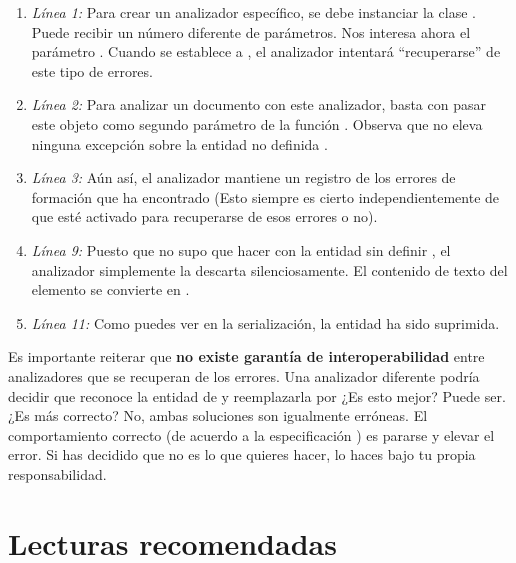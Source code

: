 \begin{enumerate}

  \item \emph{Línea 1:} Para crear un analizador específico, se debe instanciar la clase . Puede recibir un número diferente de parámetros. Nos interesa ahora el parámetro . Cuando se establece a , el analizador  intentará ``recuperarse'' de este tipo de errores.

\item \emph{Línea 2:} Para analizar un documento  con este analizador, basta con pasar este objeto  como segundo parámetro de la función . Observa que  no eleva ninguna excepción sobre la entidad no definida .

\item \emph{Línea 3:} Aún así, el analizador mantiene un registro de los errores de formación que ha encontrado (Esto siempre es cierto independientemente de que esté activado para recuperarse de esos errores o no).

\item \emph{Línea 9:} Puesto que no supo que hacer con la entidad sin definir , el analizador simplemente la descarta silenciosamente. El contenido de texto del elemento  se convierte en .

\item \emph{Línea 11:} Como puedes ver en la serialización, la entidad  ha sido suprimida.

\end{enumerate}

Es importante reiterar que \textbf{no existe garantía de interoperabilidad} entre analizadores  que se recuperan de los errores. Una analizador diferente podría decidir que reconoce la entidad  de  y reemplazarla por  ¿Es esto mejor? Puede ser. ¿Es más correcto? No, ambas soluciones son igualmente erróneas. El comportamiento correcto (de acuerdo a la especificación ) es pararse y elevar el error. Si has decidido que no es lo que quieres hacer, lo haces bajo tu propia responsabilidad.

\section{Lecturas recomendadas}

